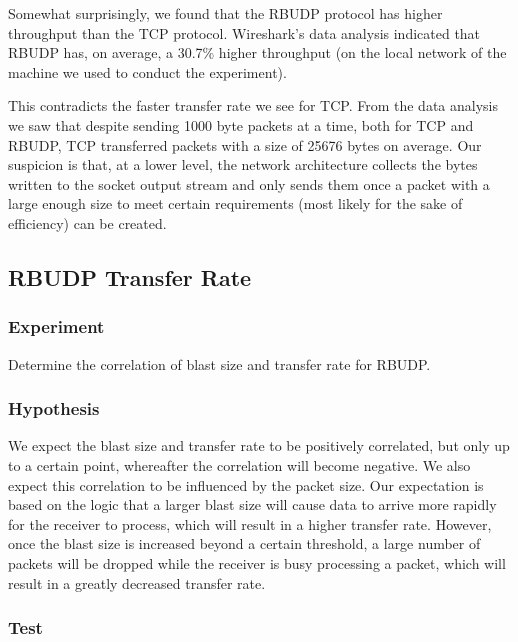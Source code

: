 \documentclass[10pt, a4paper]{article}
\begin{document}
Somewhat surprisingly, we found that the RBUDP protocol has higher throughput
than the TCP protocol. Wireshark's data analysis indicated that RBUDP has, on
average, a 30.7\% higher throughput (on the local network of the machine we used
to conduct the experiment).

This contradicts the faster transfer rate we see for TCP. From the data analysis
we saw that despite sending 1000 byte packets at a time, both for TCP and RBUDP,
TCP transferred packets with a size of 25676 bytes on average. Our suspicion is
that, at a lower level, the network architecture collects the bytes written to
the socket output stream and only sends them once a packet with a large enough
size to meet certain requirements (most likely for the sake of efficiency) can
be created.

\subsection{RBUDP Transfer Rate}
\label{subsec:rbudp-trans-rate}

\subsubsection{Experiment}
\label{subsubsec:exp-2}

Determine the correlation of blast size and transfer rate for RBUDP.

\subsubsection{Hypothesis}
\label{subsubsec:exp-2}

We expect the blast size and transfer rate to be positively correlated, but only
up to a certain point, whereafter the correlation will become negative. We also
expect this correlation to be influenced by the packet size. Our expectation is
based on the logic that a larger blast size will cause data to arrive more
rapidly for the receiver to process, which will result in a higher transfer
rate. However, once the blast size is increased beyond a certain threshold, a
large number of packets will be dropped while the receiver is busy processing a
packet, which will result in a greatly decreased transfer rate.

\subsubsection{Test}
\label{subsubsec:test-2}
\end{document}
